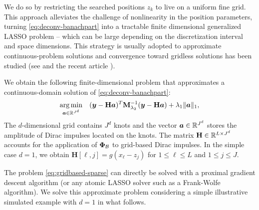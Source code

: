 \documentclass[12pt]{article}
\begin{document}

    
        We do so by restricting the searched positions $z_k$ to live on a uniform fine grid. This approach alleviates the challenge of nonlinearity in the position parameters, turning \eqref{eq:deconv-banachpart} into a tractable finite dimensional generalized LASSO problem -- which can be large depending on the discretization interval and space dimensions. This strategy is usually adopted to approximate continuous-problem solutions \cite{simeoni2020functional,Debarre2019} and convergence toward gridless solutions has been studied (see \cite{duval2017sparseI,debarre2022part2} and the recent article \cite{guillemet2025a}). 

        We obtain the following finite-dimensional problem\footnotemark{} that approximates a continuous-domain solution of \eqref{eq:deconv-banachpart}:
        \begin{equation}
            \label{eq:gridbased-sparse}
            \underset{ \bm{a} \in \mathbb{R}^{J^d}}{\arg\min} \quad ( \bm{y} - \mathbf{H}\bm{a}  )^T \mathbf{M}_{\lambda_{2}}^{-1} ( \bm{y} - \mathbf{H}\bm{a}  )  + \lambda_{1} \| \bm{a} \|_{1},
        \end{equation}
        The $d$-dimensional grid contains $J^d$ knots and the vector $\bm{a}\in\mathbb{R}^{J^d}$ stores the amplitude of Dirac impulses located on the knots.
        The matrix $\mathbf{H} \in \mathbb{R}^{L \times J^d}$ accounts for the application of $\bm{\Phi}_\mathcal{B}$ to grid-based Dirac impulses.
        In the simple case $d=1$, we obtain $\mathbf{H}[\ell, j] = g(x_{\ell} - z_j)$ for $1 \leq \ell \leq L $ and $1 \leq j \leq J$.
        
        The problem \eqref{eq:gridbased-sparse} can directly be solved with a proximal gradient descent algorithm (or any atomic LASSO solver such as a Frank-Wolfe algorithm). We solve this approximate problem considering a simple illustrative simulated example with $d=1$ in what follows.
\end{document}
